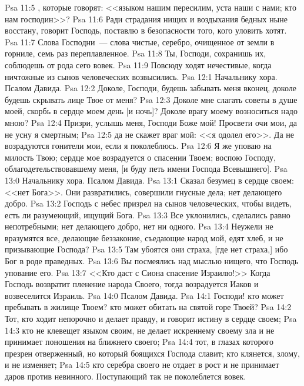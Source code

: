 \vs Psa 11:5 , которые говорят: <<языком нашим пересилим, уста наши с нами; кто нам господин>>?
\vs Psa 11:6 Ради страдания нищих и воздыхания бедных ныне восстану, говорит Господь, поставлю в безопасности того, кого уловить хотят.
\vs Psa 11:7 Слова Господни~--- слова чистые, серебро, очищенное от земли в горниле, семь раз переплавленное.
\vs Psa 11:8 Ты, Господи, сохранишь их, соблюдешь от рода сего вовек.
\vs Psa 11:9 Повсюду ходят нечестивые, когда ничтожные из сынов человеческих возвысились.
\vs Psa 12:1 Начальнику хора. Псалом Давида.
\rsbpar\vs Psa 12:2 Доколе, Господи, будешь забывать меня вконец, доколе будешь скрывать лице Твое от меня?
\vs Psa 12:3 Доколе мне слагать советы в душе моей, скорбь в сердце моем день [и ночь]? Доколе врагу моему возноситься надо мною?
\vs Psa 12:4 Призри, услышь меня, Господи Боже мой! Просвети очи мои, да не усну я  смертным;
\vs Psa 12:5 да не скажет враг мой: <<я одолел его>>. Да не возрадуются гонители мои, если я поколеблюсь.
\vs Psa 12:6 Я же уповаю на милость Твою; сердце мое возрадуется о спасении Твоем; воспою Господу, облагодетельствовавшему меня, [и буду петь имени Господа Всевышнего].
\vs Psa 13:0 Начальнику хора. Псалом Давида.
\rsbpar\vs Psa 13:1 Сказал безумец в сердце своем: <<нет Бога>>. Они развратились, совершили гнусные дела; нет делающего добро.
\vs Psa 13:2 Господь с небес призрел на сынов человеческих, чтобы видеть, есть ли разумеющий, ищущий Бога.
\vs Psa 13:3 Все уклонились, сделались равно непотребными; нет делающего добро, нет ни одного.
\vs Psa 13:4 Неужели не вразумятся все, делающие беззаконие, съедающие народ мой,  едят хлеб, и не призывающие Господа?
\vs Psa 13:5 Там убоятся они страха, [где нет страха,] ибо Бог в роде праведных.
\vs Psa 13:6 Вы посмеялись над мыслью нищего, что Господь упование его.
\vs Psa 13:7 <<Кто даст с Сиона спасение Израилю!>> Когда Господь возвратит пленение народа Своего, тогда возрадуется Иаков и возвеселится Израиль.
\vs Psa 14:0 Псалом Давида.
\rsbpar\vs Psa 14:1 Господи! кто может пребывать в жилище Твоем? кто может обитать на святой горе Твоей?
\vs Psa 14:2 Тот, кто ходит непорочно и делает правду, и говорит истину в сердце своем;
\vs Psa 14:3 кто не клевещет языком своим, не делает искреннему своему зла и не принимает поношения на ближнего своего;
\vs Psa 14:4 тот, в глазах которого презрен отверженный, но который боящихся Господа славит; кто клянется,  злому, и не изменяет;
\vs Psa 14:5 кто серебра своего не отдает в рост и не принимает даров против невинного. Поступающий так не поколеблется вовек.
